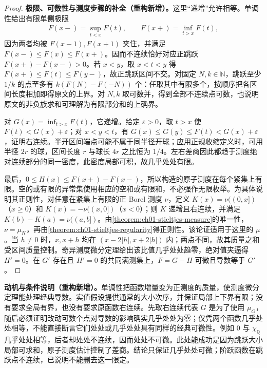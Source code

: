 \documentclass[../../main.tex]{subfiles}%
\begin{document}
\begin{proof}
\textbf{极限、可数性与测度步骤的补全（重构新增）。}这里“递增”允许相等。单调性给出有限单侧极限
\begin{align*}
F(x-)=\sup_{t<x}F(t),\qquad F(x+)=\inf_{t>x}F(t),
\end{align*}
因为两者均被 $F(x-1),F(x+1)$ 夹住，并满足 $F(x-)\le F(x)\le F(x+)$。因而不连续恰好对应正跳跃 $F(x+)-F(x-)>0$。若 $x<y$，取 $x<t<y$ 得 $F(x+)\le F(t)\le F(y-)$，故正跳跃区间不交。对固定 $N,k\in\mathbb N$，跳跃至少 $1/k$ 的点至多有 $k(F(N)-F(-N))$ 个：任取其中有限多个，按顺序把各区间长度相加即得原文的上界。对 $N,k$ 取可数并，得到全部不连续点可数，也说明原文的非负族求和可理解为有限部分和的上确界。

对 $G(x)=\inf_{t>x}F(t)$，它递增。给定 $\varepsilon>0$，取 $t>x$ 使 $F(t)<G(x)+\varepsilon$；对 $x<y<t$，有 $G(x)\le G(y)\le F(t)<G(x)+\varepsilon$，证明右连续。半开区间端点可能不属于同半径开球；应用正规收缩定义时，可用半径 $2r$ 的球，区间长度 $r$ 与球长 $4r$ 之比恒为 $1/4$。左右差商因此都趋于测度绝对连续部分的同一密度，此密度局部可积，故几乎处处有限。

最后，$0\le H(x)\le F(x+)-F(x-)$，所以构造的原子测度在每个紧集上有限。空的或有限的异常集使用相应的空和或有限和，不必强作无限枚举。为具体说明其正则性，对任意在紧集上有限的正 Borel 测度 $\nu$，定义 $K(x)=\nu((0,x])$（$x\ge0$）和 $K(x)=-\nu((x,0])$（$x<0$）；则 $K$ 递增且右连续，并满足 $K(b)-K(a)=\nu((a,b])$。由\cref{theorem:ch01-stieltjes-measure}的唯一性，$\nu=\mu_K$，再由\cref{theorem:ch01-stieltjes-regularity}得正则性。该论证适用于这里的 $\mu$。当 $h\ne0$ 时，$x,x+h$ 均在 $(x-2|h|,x+2|h|)$ 内；两点不同，故其质量之和受区间质量控制。奇异测度微分定理给出该比值几乎处处趋零，绝对值夹逼得 $H'=0$。在 $G'$ 存在且 $H'=0$ 的共同满测集上，$F=G-H$ 可微且导数等于 $G'$。
\end{proof}
\begin{remark}
\textbf{动机与条件说明（重构新增）。}单调性把函数增量变为正测度的质量，使测度微分定理能处理经典导数。实值假设提供通常的大小次序，并保证局部上下界有限；没有要求全局有界，也没有要求原函数右连续。先取右连续代表 $G$ 是为了使用 $\mu_G$，随后必须证明改动可数个点对导数的影响确实几乎处处为零；仅凭两个函数几乎处处相等，不能直接断言它们处处或几乎处处具有同样的经典可微性。例如 $0$ 与 $\chi_{\mathbb Q}$ 几乎处处相等，后者却处处不连续，因而处处不可微。此处能成功是因为跳跃大小局部可求和，原子测度估计控制了差商。结论只保证几乎处处可微；阶跃函数在跳跃点不连续，已说明不能删去这一限定。
\end{remark}
\end{document}
